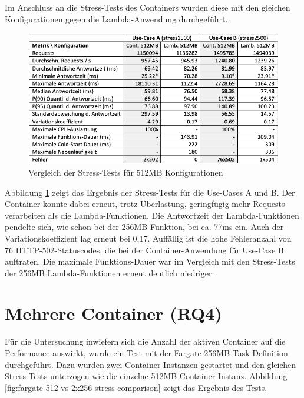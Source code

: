 Im Anschluss an die Stress-Tests des Containers wurden diese mit den gleichen Konfigurationen gegen die Lambda-Anwendung durchgeführt.

\begin{figure}[H]
    \includegraphics[width=\textwidth]{img/512MB-stress-comparison.png}
    \caption[Vergleich der Stress-Tests für 512MB Konfigurationen]{Vergleich der Stress-Tests für 512MB Konfigurationen}
    \label{fig:512MB-stress-comparison}
\end{figure}

Abbildung \ref{fig:512MB-stress-comparison} zeigt das Ergebnis der Stress-Tests für die Use-Cases A und B. Der Container konnte dabei erneut, trotz Überlastung, geringfügig mehr Requests verarbeiten als die Lambda-Funktionen. Die Antwortzeit der Lambda-Funktionen pendelte sich, wie schon bei der 256MB Funktion, bei ca. 77ms ein. Auch der Variationskoeffizient lag erneut bei 0,17. Auffällig ist die hohe Fehleranzahl von 76 HTTP-502-Statuscodes, die bei der Container-Anwendung für Use-Case B auftraten. Die maximale Funktions-Dauer war im Vergleich mit den Stress-Tests der 256MB Lambda-Funktionen erneut deutlich niedriger.

\section{Mehrere Container (RQ4)}
Für die Untersuchung inwiefern sich die Anzahl der aktiven Container auf die Performance auswirkt, wurde ein Test mit der Fargate 256MB Task-Definition durchgeführt. Dazu wurden zwei Container-Instanzen gestartet und den gleichen Stress-Tests unterzogen wie die einzelne 512MB Container-Instanz. Abbildung \ref{fig:fargate-512-vs-2x256-stress-comparison} zeigt das Ergebnis des Tests.

